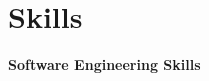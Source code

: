 \documentclass[10pt]{article} %
\begin{document}
{%












\section*{Skills}

\begin{minipage}[t]{0.48\textwidth}
  \textbf{\large \color{slateblue} Software Engineering Skills}


\end{minipage}}
\end{document}
